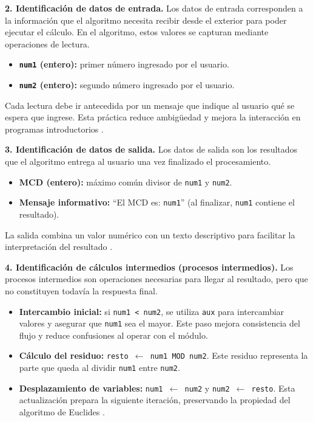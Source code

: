 \documentclass[12pt,twoside]{book}
\begin{document}
						\noindent
						\textbf{2. Identificación de datos de entrada.}
						Los datos de entrada corresponden a la información que el algoritmo necesita recibir desde el exterior para poder ejecutar el cálculo. En el algoritmo, estos valores se capturan mediante operaciones de lectura.
						
						\begin{itemize}
							\item \textbf{\texttt{num1} (entero):} primer número ingresado por el usuario.
							\item \textbf{\texttt{num2} (entero):} segundo número ingresado por el usuario.
						\end{itemize}
						
						\noindent
						Cada lectura debe ir antecedida por un mensaje que indique al usuario qué se espera que ingrese. Esta práctica reduce ambigüedad y mejora la interacción en programas introductorios \cite{Gaddis2022Starting,Farrell2018Programming}.
						
						\noindent
						\textbf{3. Identificación de datos de salida.}
						Los datos de salida son los resultados que el algoritmo entrega al usuario una vez finalizado el procesamiento.
						
						\begin{itemize}
							\item \textbf{MCD (entero):} máximo común divisor de \texttt{num1} y \texttt{num2}.
							\item \textbf{Mensaje informativo:} ``El MCD es: \texttt{num1}'' (al finalizar, \texttt{num1} contiene el resultado).
						\end{itemize}
						
						\noindent
						La salida combina un valor numérico con un texto descriptivo para facilitar la interpretación del resultado \cite{Gaddis2022Starting,Farrell2018Programming}.
						
						\noindent
						\textbf{4. Identificación de cálculos intermedios (procesos intermedios).}
						Los procesos intermedios son operaciones necesarias para llegar al resultado, pero que no constituyen todavía la respuesta final.
						
						\begin{itemize}
							\item \textbf{Intercambio inicial:} si \texttt{num1 < num2}, se utiliza \texttt{aux} para intercambiar valores y asegurar que \texttt{num1} sea el mayor. Este paso mejora consistencia del flujo y reduce confusiones al operar con el módulo.
							\item \textbf{Cálculo del residuo:} \texttt{resto $\leftarrow$ num1 MOD num2}. Este residuo representa la parte que queda al dividir \texttt{num1} entre \texttt{num2}.
							\item \textbf{Desplazamiento de variables:} \texttt{num1 $\leftarrow$ num2} y \texttt{num2 $\leftarrow$ resto}. Esta actualización prepara la siguiente iteración, preservando la propiedad del algoritmo de Euclides \cite{Cormen2022Introduction}.
						\end{itemize}
						
\end{document}
